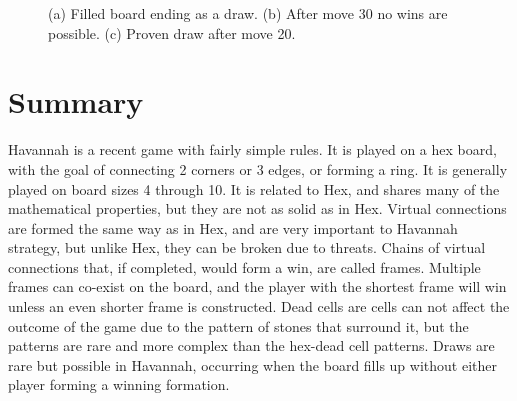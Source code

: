 \begin{figure}
	\centering
	\subfloat[]{\label{fig:drawproven}
		\begin{HavannahBoard}[board size=4,coordinate style=classical,show coordinates=false]
		\HGame{g7,a1,f5,g4,e3,d2,e2,d1,c2,d3,c3,f7,d6,b4,a4,b5,a3,e5,c4,b3}%
		\end{HavannahBoard}
	}
	\caption[Havannah Draws]{(a) Filled board ending as a draw. (b) After move 30 no wins are possible. (c) Proven draw after move 20.}
	\label{fig:draw}
\end{figure}


\section{Summary}

Havannah is a recent game with fairly simple rules. It is played on a hex board, with the goal of connecting 2 corners or 3 edges, or forming a ring. It is generally played on board sizes 4 through 10. It is related to Hex, and shares many of the mathematical properties, but they are not as solid as in Hex. Virtual connections are formed the same way as in Hex, and are very important to Havannah strategy, but unlike Hex, they can be broken due to threats. Chains of virtual connections that, if completed, would form a win, are called frames. Multiple frames can co-exist on the board, and the player with the shortest frame will win unless an even shorter frame is constructed. Dead cells are cells can not affect the outcome of the game due to the pattern of stones that surround it, but the patterns are rare and more complex than the hex-dead cell patterns. Draws are rare but possible in Havannah, occurring when the board fills up without either player forming a winning formation.

